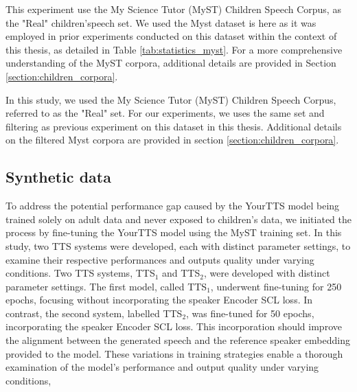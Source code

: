 This experiment use the My Science Tutor (MyST) Children Speech Corpus, as the "Real" children'speech set. We used the Myst dataset is here as it was employed in prior experiments conducted on this dataset within the context of this thesis, as detailed in Table \ref{tab:statistics_myst}. For a more comprehensive understanding of the MyST corpora, additional details are provided in Section \ref{section:children_corpora}.

In this study, we used the My Science Tutor (MyST) Children Speech Corpus, referred to as the "Real" set. For our experiments, we uses the same set and filtering as previous experiment on this dataset in this thesis. Additional details on the filtered Myst corpora are provided in section \ref{section:children_corpora}.

\subsection{Synthetic data}
To address the potential performance gap caused by the YourTTS model being trained solely on adult data and never exposed to children's data, we initiated the process by fine-tuning the YourTTS model using the MyST training set. In this study, two \ac{TTS} systems were developed, each with distinct parameter settings, to examine their respective performances and outputs quality under varying conditions. Two \ac{TTS} systems, TTS$_1$ and TTS$_2$, were developed with distinct parameter settings. The first model, called TTS$_1$, underwent fine-tuning for 250 epochs, focusing without incorporating the speaker Encoder \ac{SCL} loss. In contrast, the second system, labelled TTS$_2$, was fine-tuned for 50 epochs, incorporating the speaker Encoder \ac{SCL} loss. This incorporation should improve the alignment between the generated speech and the reference speaker embedding provided to the model. These variations in training strategies enable a thorough examination of the model's performance and output quality under varying conditions,

